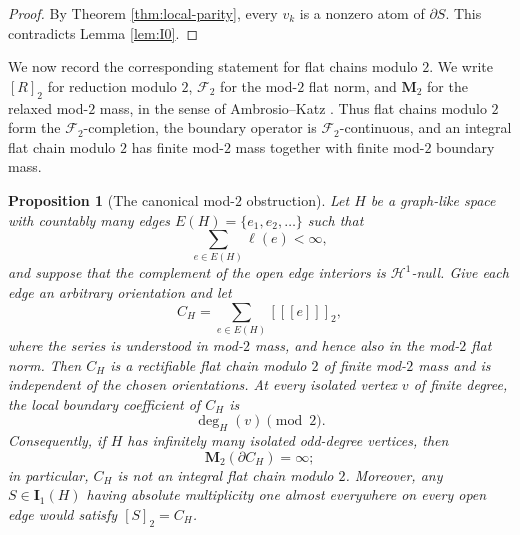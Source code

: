 \documentclass[11pt]{article}
\newtheorem{proposition}[theorem]{Proposition}
\theoremstyle{remark}
\newcommand{\M}{\mathbf M}
\newcommand{\I}{\mathbf I}
\newcommand{\Hh}{\mathcal H}
\newcommand{\llbracket}{[\![}
\newcommand{\rrbracket}{]\!]}
\begin{document}
\begin{proof}
By Theorem \ref{thm:local-parity}, every $v_k$ is a nonzero atom of $\partial S$. This contradicts Lemma \ref{lem:I0}.
\end{proof}

We now record the corresponding statement for flat chains modulo $2$. We write
$[R]_2$ for reduction modulo $2$, $\mathcal F_2$ for the mod-$2$ flat norm,
and $\M_2$ for the relaxed mod-$2$ mass, in the sense of Ambrosio--Katz
\cite[Sections~6 and 10]{AmbrosioKatz11}. Thus flat chains modulo $2$ form the
$\mathcal F_2$-completion, the boundary operator is $\mathcal F_2$-continuous,
and an integral flat chain modulo $2$ has finite mod-$2$ mass together with
finite mod-$2$ boundary mass.

\begin{proposition}[The canonical mod-$2$ obstruction]\label{prop:mod2}
Let $H$ be a graph-like space with countably many edges
$E(H)=\{e_1,e_2,\ldots\}$ such that
\[
       \sum_{e\in E(H)}\ell(e)<\infty,
\]
and suppose that the complement of the open edge interiors is
$\Hh^1$-null. Give each edge an arbitrary orientation and let
\[
       C_H=\sum_{e\in E(H)}[\llbracket e\rrbracket]_2,
\]
where the series is understood in mod-$2$ mass, and hence also in the
mod-$2$ flat norm. Then $C_H$ is a rectifiable flat chain modulo $2$ of
finite mod-$2$ mass and is independent of the chosen orientations. At every
isolated vertex $v$ of finite degree, the local boundary coefficient of
$C_H$ is
\[
       \deg_H(v)\pmod2.
\]
Consequently, if $H$ has infinitely many isolated odd-degree vertices, then
\[
       \M_2(\partial C_H)=\infty;
\]
in particular, $C_H$ is not an integral flat chain modulo $2$. Moreover, any $S\in\I_1(H)$ having absolute multiplicity one almost everywhere on every open edge would satisfy $[S]_2=C_H$.
\end{proposition}
\end{document}
